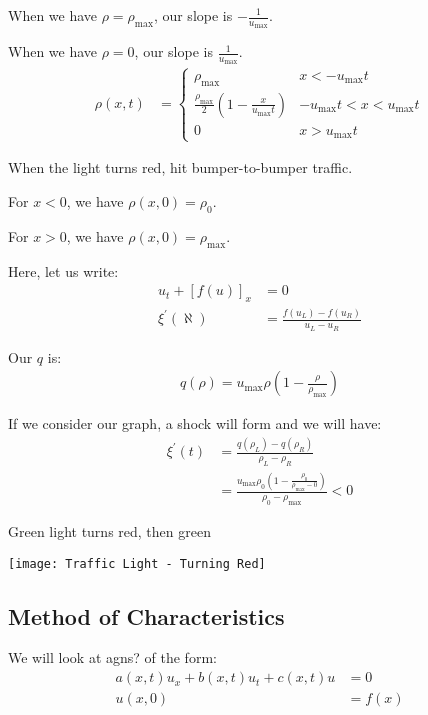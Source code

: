   When we have $\rho = \rho_{\max}$, our slope is $- \frac{1}{u_{\max}}$.

  When we have $\rho = 0$, our slope is $\frac{1}{u_{\max}}$.
  \begin{align}
    \rho(x, t) & =
    \begin{cases}
      \rho_{\max} & x < - u_{\max} t\\
      \frac{\rho_{\max}}{2} \left(1 - \frac{x}{u_{\max}t}\right)
      & -u_{\max} t < x < u_{\max} t\\
      0 & x > u_{\max} t
    \end{cases}
  \end{align}

  \ex When the light turns red, hit bumper-to-bumper traffic.

  For $x < 0$, we have $\rho(x, 0) = \rho_0$.

  For $x > 0$, we have $\rho(x, 0) = \rho_{\max}$.

  Here, let us write:
  \begin{align}
    u_t + [f(u)]_x & = 0\\
    \xi^\prime(\aleph) & = \frac{f(u_L) - f(u_R)}{u_L - u_R}
  \end{align}

  Our $q$ is:
  \begin{align}
    q(\rho) = u_{\max} \rho\left(1 - \frac{\rho}{\rho_{\max}}\right)
  \end{align}

  If we consider our graph, a shock will form and we will have:
  \begin{align}
    \xi^\prime(t) & = \frac{q(\rho_L) - q(\rho_R)}{\rho_L - \rho_R}\\
    & = \frac{u_{\max} \rho_0 \left( 1 - \frac{\rho_0}{\rho_{\max}
    - 0}\right)}{\rho_0 - \rho_{\max}} < 0
  \end{align}


  \ex Green light turns red, then green

  \begin{center}
    \texttt{[image: Traffic Light - Turning Red]}
  \end{center}

  \subsection{Method of Characteristics}

  We will look at agns? of the form:
  \begin{align}
    a(x, t) u_x + b(x, t) u_t + c(x, t) u & = 0\\
    u(x, 0) & = f(x)
  \end{align}

